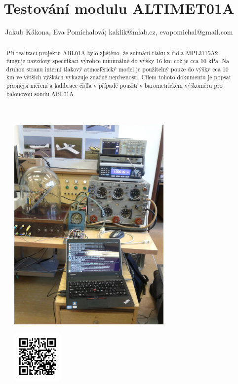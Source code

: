 \documentclass[12pt,a4paper,oneside]{article}
\begin{document}
\title{Testování modulu ALTIMET01A}
\author{Jakub Kákona, Eva Pomíchalová; kaklik@mlab.cz, evapomichal@gmail.com}
\maketitle

\thispagestyle{empty}
\begin{abstract}
Při realizaci projektu ABL01A bylo zjištěno, že snímání tlaku z čidla MPL3115A2 funguje navzdory specifikaci výrobce minimálně do výšky 16 km což je cca 10 kPa. Na druhou stranu interní tlakový atmosférický model je použitelný pouze do výšky cca 10 km ve větších výškách vykazuje značné nepřesnosti. Cílem tohoto dokumentu je popsat přesnější měření a kalibrace čidla v případě použití v barometrickém výškoměru pro balonovou sondu ABL01A
\end{abstract}

\begin{figure} [htbp]
\begin{center}
\includegraphics [width=80mm] {./img/altimet01a_testing_setup.jpg} 
\end{center}
\end{figure}

\begin{figure} [b]
\includegraphics [width=25mm] {./img/ALTIMET01A_QRcode.png} 
\end{figure}
\end{document}
